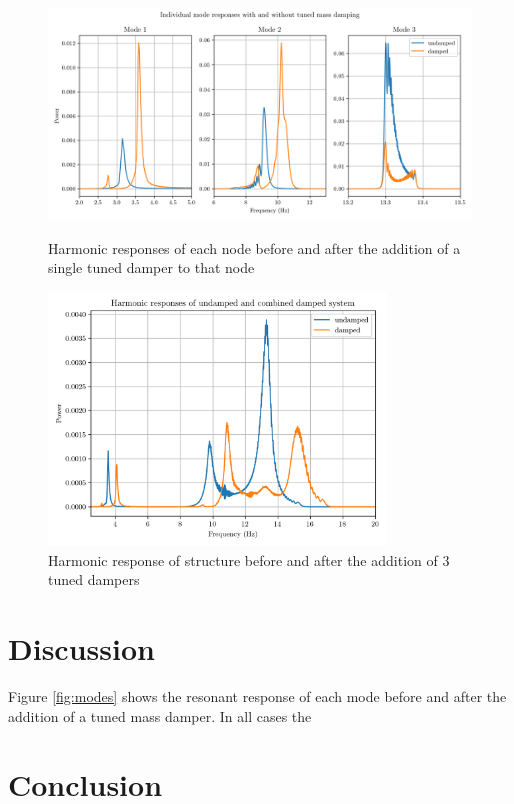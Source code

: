 \documentclass[9pt]{article}
\begin{document}
\begin{figure}[H]
    
    \centering
    \includegraphics[width=1\textwidth]{modes.png}
    \caption{\label{fig:modes} Harmonic responses of each node before and after the addition of a single tuned damper to that node}
    \includegraphics[width=0.8\textwidth]{combined_full_sweep.png}
    \caption{\label{fig:combined_full_sweep} Harmonic response of structure before and after the addition of 3 tuned dampers}
\end{figure}

\newpage
\section{Discussion}

Figure \ref{fig:modes} shows the resonant response of each mode before and after the addition of a tuned mass damper.
In all cases the 


\section{Conclusion}
\end{document}

